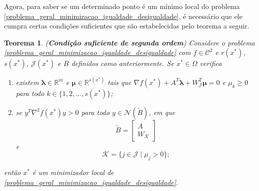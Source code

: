 \documentclass[12pt,a4paper]{scrartcl}
\def\RR{\mathds{R}}
\newtheorem{teo}{Teorema}
\theoremstyle{definition}%
\begin{document}
Agora, para saber se um determinado ponto é um mínimo local do problema \eqref{problema_geral_minimizacao_igualdade_desigualdade}, é necessário que ele cumpra certas condições suficientes que são estabelecidas pelo teorema a seguir. 

\begin{teo}(\textbf{Condição suficiente de segunda ordem}) \label{teo:condicao_suficiente_igualdade_desigualdade}
Considere o problema \eqref{problema_geral_minimizacao_igualdade_desigualdade} com $f \in \mathcal{C}^{2}$ e $r(x^{*})$, $s(x^{*})$, $\mathcal{J}(x^{*})$ e $B$ definidos como anteriormente. Se $x^{*} \in \Omega$ verifica
\begin{enumerate}
	\item[(i)] existem $\boldsymbol{\lambda} \in \RR^{m}$ e $\boldsymbol{\mu} \in \RR^{s(x^{*})}$ tais que $\nabla f(x^{*}) + A^{T}\boldsymbol{\lambda} + W^{T}_{\mathcal{J}} \boldsymbol{\mu} =0$ e $\mu_{k} \geq 0$ para todo $k\in \{ 1,2, \ldots , s(x^{*}) \}$;
	\item[(ii)] se $y^{T}\nabla^{2} f(x^{*})y >0$ para todo $y\in \mathcal{N}(\tilde{B})$, em que
	\[
	\tilde{B} = \begin{bmatrix*} A \\ W_{\mathcal{K}} \end{bmatrix*}
	\]
	e
	\[
	\mathcal{K} = \{ j\in \mathcal{J} \mid \mu_{j} >0 \};
	\]
\end{enumerate}
então $x^{*}$ é um minimizador local de \eqref{problema_geral_minimizacao_igualdade_desigualdade}.
\end{teo}
\end{document}
